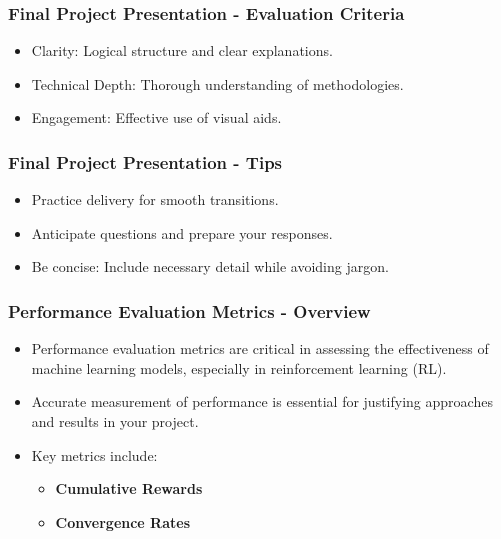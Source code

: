 \documentclass[aspectratio=169]{beamer}
\begin{document}
\begin{frame}[fragile]
    \frametitle{Final Project Presentation - Evaluation Criteria}
    \begin{itemize}
        \item Clarity: Logical structure and clear explanations.
        \item Technical Depth: Thorough understanding of methodologies.
        \item Engagement: Effective use of visual aids.
    \end{itemize}
\end{frame}

\begin{frame}[fragile]
    \frametitle{Final Project Presentation - Tips}
    \begin{itemize}
        \item Practice delivery for smooth transitions.
        \item Anticipate questions and prepare your responses.
        \item Be concise: Include necessary detail while avoiding jargon.
    \end{itemize}
\end{frame}

\begin{frame}[fragile]
    \frametitle{Performance Evaluation Metrics - Overview}
    \begin{itemize}
        \item Performance evaluation metrics are critical in assessing the effectiveness of machine learning models, especially in reinforcement learning (RL).
        \item Accurate measurement of performance is essential for justifying approaches and results in your project.
        \item Key metrics include:
            \begin{itemize}
                \item \textbf{Cumulative Rewards}
                \item \textbf{Convergence Rates}
            \end{itemize}
    \end{itemize}
\end{frame}
\end{document}
